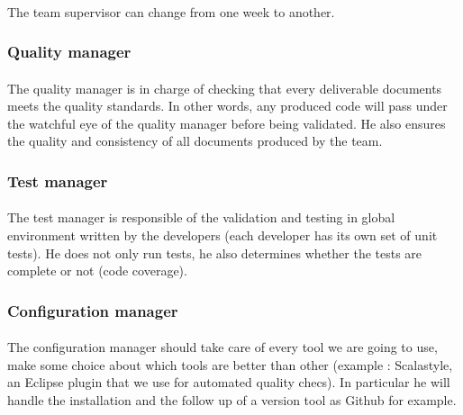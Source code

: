 \documentclass{report}
\begin{document}
\paragraph{}
\hspace{4mm}\textnormal{The team supervisor can change from one week to another.}

\subsubsection{Quality manager}

\paragraph{}
\hspace{4mm}\textnormal{The quality manager is in charge of checking that every deliverable documents meets the quality standards. In other words, any produced code will pass under the watchful eye of the quality manager before being validated. He also ensures the quality and consistency of all documents produced by the team.}

\subsubsection{Test manager}

\paragraph{}
\hspace{4mm}\textnormal{The test manager is responsible of the validation and testing in global environment written by the developers (each developer has its own set of unit tests). He does not only run tests, he also determines whether the tests are complete or not (code coverage).}

\subsubsection{Configuration manager}

\paragraph{}
\hspace{4mm}\textnormal{The configuration manager should take care of every tool we are going to use, make some choice about which tools are better than other (example :
Scalastyle, an Eclipse plugin that we use for automated quality checs).
In particular he will handle the installation and the follow up of a version tool as Github for example.}
\end{document}
